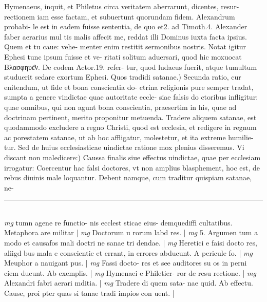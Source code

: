 \documentclass{article}
\begin{document}
\begin{pages}
Hymenaeus, inquit, et Philetus circa veritatem aberrarunt, dicentes, resur- rectionem iam esse factam, et subuertunt quorundam fidem. Alexandrum probabi- le est in eadem fuisse sententia, de quo et2. ad Timoth.4. Alexander faber aerarius mul tis malis affecit me, reddat illi Dominus iuxta facta ipsius. Quem et tu caue: vehe- menter enim restitit sermonibus nostris. Notat igitur Ephesi tunc ipsum fuisse et ve- ritati solitum aduersari, quod hic moxuocat Βλασφηυε͂ν. De codem Actor.19. refer- tur, quod ludaeus fuerit, atque tumultum studuerit sedare exortum Ephesi.  \pend\pstart Quos tradidi satanae.) Secunda ratio, cur enitendum, ut fide et bona conscientia do- ctrina religionis pure semper tradat, sumpta a genere vindictae quae autoritate eccle- siae falsis do ctoribus infligitur: quae omnibus, qui non agunt bona conscientia, praesertim in his, quae ad doctrinam pertinent, merito proponitur metuenda. Tradere aliquem satanae, est quodammodo excludere a regno Christi, quod est ecclesia, et redigere in regnum ac porestatem satanae, ut ab hoc affligatur, molestetur, et ita extreme humilie- tur. Sed de huius ecclesiasticae uindictae ratione mox plenius disseremus.  \pend\pstart Vi discant non maledicere:) Caussa finalis siue effectus uindictae, quae per ecclesiam irrogatur: Coercentur hac falsi doctores, vt non amplius blasphement, hoc est, de rebus diuinis male loquantur. Debent namque, cum traditur quispiam satanae, ne-  \pend
\vspace{0.5cm}\noindent
\vspace{0.2cm}\rule{1cm}{0.2pt}\\ 
\hspace{0.2cm}\textit{mg}
\footnotesize tumn agene re functio- nis ecclest sticae eius- demquediffi cultatibus. Metaphora are militar 
\normalsize| 
\hspace{0.2cm}\textit{mg}
\footnotesize Doctorum u rorum labd res. 
\normalsize| 
\hspace{0.2cm}\textit{mg}
\footnotesize 5. Argumen tum a modo et causafos mali doctri ne sanae tri dendae. 
\normalsize| 
\hspace{0.2cm}\textit{mg}
\footnotesize Heretici e faisi docto res, aliigd bus mala e conscientie et errant, in errores abducunt. A pericule fo. 
\normalsize| 
\hspace{0.2cm}\textit{mg}
\footnotesize Meuphor a nauigant pus. 
\normalsize| 
\hspace{0.2cm}\textit{mg}
\footnotesize Fassi docto- res et see auditores su os in perni ciem ducunt. Ab exemplis. 
\normalsize| 
\hspace{0.2cm}\textit{mg}
\footnotesize Hymenaei e Philetier- ror de resu rectione. 
\normalsize| 
\hspace{0.2cm}\textit{mg}
\footnotesize Alexandri fabri aerari mditia. 
\normalsize| 
\hspace{0.2cm}\textit{mg}
\footnotesize Tradere di quem sata- nae quid. Ab effectu. Cause, proi pter quas si tanae tradi impios con uent. 
\normalsize| 

\end{pages}
\end{document}
